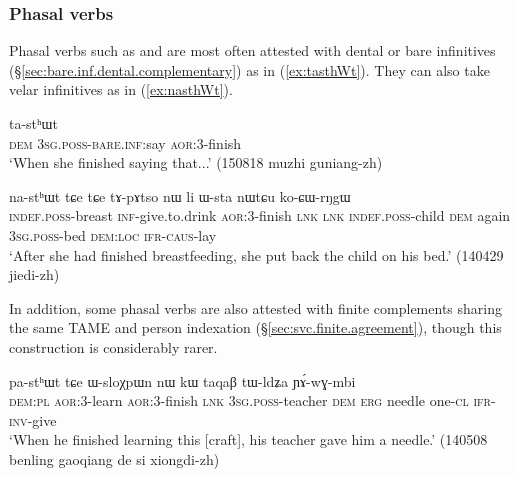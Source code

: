 \subsubsection{Phasal verbs} \label{sec:phasal.complements}

Phasal verbs such as   and   are most often attested with dental or bare infinitives (§\ref{sec:bare.inf.dental.complementary}) as in (\ref{ex:tasthWt}).  They can also take  velar infinitives as in (\ref{ex:nasthWt}).

\begin{exe}
\ex \label{ex:tasthWt}
\gll [nɯ ɯ-ti] ta-stʰɯt  \\
\textsc{dem} \textsc{3sg}.\textsc{poss}-\textsc{bare}.\textsc{inf}:say \textsc{aor}:3\flobv{}-finish \\
\glt `When she finished saying that...' (150818 muzhi guniang-zh)
\end{exe}
 

\begin{exe}
\ex \label{ex:nasthWt}
\gll [tɯ-nɯ kɤ-jtsʰi] na-stʰɯt tɕe tɕe tɤ-pɤtso nɯ li ɯ-sta nɯtɕu ko-ɕɯ-rŋgɯ	\\
\textsc{indef}.\textsc{poss}-breast \textsc{inf}-give.to.drink \textsc{aor}:3\flobv{}-finish \textsc{lnk} \textsc{lnk} \textsc{indef}.\textsc{poss}-child \textsc{dem} again \textsc{3sg}.\textsc{poss}-bed \textsc{dem}:\textsc{loc} \textsc{ifr}-\textsc{caus}-lay \\
\glt `After she had finished breastfeeding, she put back the child on his bed.' (140429 jiedi-zh)
\end{exe}

In addition, some phasal verbs are also attested with finite complements sharing the same TAME and person indexation (§\ref{sec:svc.finite.agreement}), though this construction is considerably rarer.

\begin{exe}
\ex \label{ex:pasthWt}
 pa-stʰɯt tɕe ɯ-sloχpɯn nɯ kɯ taqaβ tɯ-ldʑa ɲɤ́-wɣ-mbi \\
 \textsc{dem}:\textsc{pl} \textsc{aor}:3\flobv{}-learn \textsc{aor}:3\flobv{}-finish \textsc{lnk} \textsc{3sg}.\textsc{poss}-teacher \textsc{dem} \textsc{erg} needle one-\textsc{cl} \textsc{ifr}-\textsc{inv}-give  \\
\glt `When he finished learning this [craft], his teacher gave him a needle.' (140508 benling gaoqiang de si xiongdi-zh)
\end{exe} 

